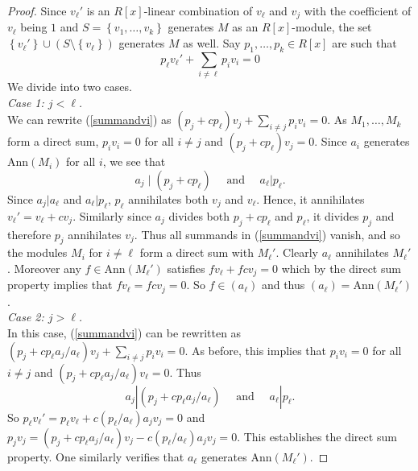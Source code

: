 \documentclass[ALCO, Unicode]{cedram}
\newcommand{\Ann}{\mathrm{Ann}}
\begin{document}
\begin{proof}  Since $ v_{\ell}' $ is an $R[x]$-linear combination of $ v_{\ell} $ and $ v_{j} $ with the coefficient of $ v_{\ell} $ being $ 1 $ and $ S =  \left \{  v_{1},  \ldots,  v_{k}   \right \} $ generates $ M $ as an $R[x]$-module, the set $  \left \{ v_{\ell} ' \right \} \cup ( S \setminus \left \{ v_{\ell} \right \} ) $  generates $ M $  as  well.     Say $ p_{1} ,  \ldots,  p_{k} \in  R[x]  $ are such that
\begin{equation}  \label{summandvi} \displaystyle p_{\ell} v_{\ell} ' +  \sum_{ i \neq \ell} p_{i} v_{i}  =  0  
\end{equation}      We divide into two cases. \\

\textit{Case 1: $j < \ell $.} \\

We can rewrite (\ref{summandvi}) as $   (p_{j} + c p_{\ell}  )   v_{j  }    +   \sum _{ i \neq j }  p_{i}   v_{i}   =  0   $. As $ M_{1} , \ldots, M_{k} $ form a direct sum,  $ p_{i} v_{i} = 0 $ for all $ i \neq j $ and   $ (p_{j} + cp_{\ell}) v_{j}  = 0  $.  Since $ a_{i} $ generates  $  \Ann  (M _{i })    $ for all $ i $, we see that   $$  a_{j}  \mid ( p_{j}  + c p_{
\ell}) \quad  \text{ and }  \quad    a_{\ell}  |  p_{\ell}  . $$ 
Since $ a_{j} | a_{\ell} $ and $ a_{\ell} | p_{\ell} $, $ p_{\ell} $ annihilates both $ v_{j} $ and $ v_{\ell} $. Hence, it annihilates $ v_{\ell} ' = v_{\ell} + c v_{j} $. Similarly since $ a_{j} $ divides  both $ p_{j} + c p_{\ell} $ and $ p_{\ell} $, it divides $ p_{j} $ and therefore $ p_{j} $ annihilates $ v_{j} $.  Thus all summands in (\ref{summandvi})  vanish, and so the modules $ M_{i} $ for $ i \neq \ell $ 
form a direct sum with $ M_{\ell} '  $. Clearly $ a_{\ell } $ annihilates $ M_{\ell} ' $. Moreover any  
$ f \in \mathrm{Ann}(M_{\ell}  '    )  $ satisfies $  f v_{\ell} +  f c v_{j} = 0 $ which by the direct sum property  implies that   $ f v_{\ell} = fcv_{j} = 0 $. So $ f \in ( a_{\ell} ) $ and thus  $ (a_{\ell} ) =  \mathrm{Ann}(M_{\ell}') $. \\

\textit{Case 2:   $ j > \ell $.} \\

 In this case, (\ref{summandvi}) can be rewritten as $ (p_{j} + c p_{\ell}  a_{j} /  a_{\ell}  ) v_{j} + \sum_{i \neq j} p_{i} v_{i} = 0 $.  As before, this implies that $ p_{i} v_{i} = 0 $ for all $i \neq j $ and $ (p_{j} + c  p_{\ell} a_{j} / a_{\ell}  )  v_{\ell} = 0 $.  Thus $$  a_{j} |  (  p_{j} + c p_{\ell} a_{j} / a_{\ell} ) \quad \text{ and } \quad a_{\ell} | p_{\ell} . $$ 
So $     p_{\ell} v_{\ell} '  = p_{\ell}    v_{\ell} +  c  \left (  p_ { \ell}  /   {  a_{\ell}  }  \right )    a_{j} v_{j}         =  0 $ and $    p_{j} v_{j}  =     (  p_{j} + c p_{\ell}  a_{j}/ a_{\ell}  )   v_{j}  -    c ( p_{\ell} / a_{\ell} )  a_{j} v_{j} = 0  $. This  establishes the direct sum property.  One similarly verifies  that $ a_{\ell} $ generates $ \mathrm{Ann}(M_{\ell} ' ) $.          
\end{proof} 
\end{document}
